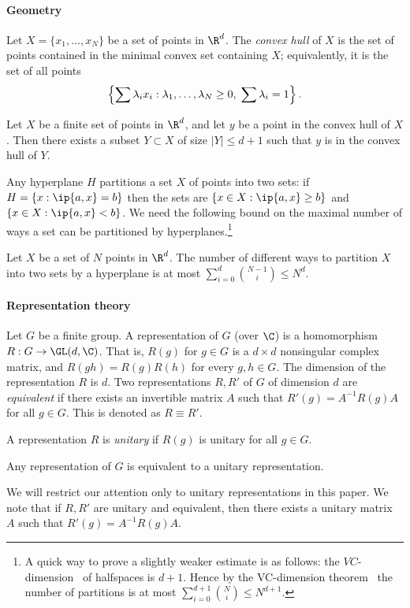 \paragraph{Geometry}
Let $X=\{x_1,\ldots,x_N\}$ be a set of points in $\R^d$. The \emph{convex hull} of $X$ is the set of points contained in the minimal convex
set containing $X$; equivalently, it is the set of all points 
\[
\Bigl\{\sum
\lambda_i x_i: \lambda_1,\ldots,\lambda_N \ge 0, \;\sum \lambda_i=1\Bigr\}\,.\]

\begin{fact}\label{fact:caratheodory}
Let $X$ be a finite set of points in $\R^d$, and let $y$ be a point
in the convex hull of $X$. Then there exists a subset $Y \subset X$
of size $|Y| \le d+1$ such that $y$ is in the convex hull of $Y$.
\end{fact}

Any hyperplane $H$ partitions a set $X$ of points into two sets: if
$H=\{x:\ip{a,x}=b\}$ then the sets are $\{x \in X:\ip{a,x} \ge b\}$
and $\{x \in X:\ip{a,x}<b\}$. We need the following bound on the maximal
number of ways
a set can be partitioned by hyperplanes.\footnote{A quick way to prove a slightly weaker estimate
is as follows: the $VC$-dimension~\cite{VC71} of
halfspaces is $d+1$. Hence by the VC-dimension
theorem~\cite{VC71,Sauer72,Shelah72} the number of partitions
is at most $\sum_{i=0}^{d+1} {N \choose i} \le N^{d+1}$.}
\begin{fact}
\label{fact:partition_hyperplane}
Let $X$ be a set of $N$ points in $\R^d$. The number
of different ways to partition $X$ into two sets by a hyperplane is
at most $\sum_{i=0}^d {{N-1} \choose i}  \leq N^{d}$.
\end{fact}

\paragraph{Representation theory}
Let $G$ be a finite group. A representation of $G$ (over $\C$) is a
homomorphism $R:G \to \GL(d,\C)$. That is, $R(g)$ for $g \in G$ is a
$d \times d$ nonsingular
complex matrix, and $R(gh) = R(g) R(h)$ for every $g,h \in
G$. The dimension of the representation $R$ is $d$. Two representations
$R,R'$ of $G$ of dimension $d$ are \emph{equivalent} if there exists an
invertible matrix $A$ such that $R'(g) = A^{-1} R(g) A$ for all $g \in
G$. This is denoted as $R \equiv R'$.

A representation $R$ is \emph{unitary}
if $R(g)$ is unitary for all $g \in G$.
\begin{fact}
Any representation of $G$ is equivalent to a unitary representation.
\end{fact}
We will restrict our attention only to unitary representations in this
paper. We note that if $R,R'$ are unitary and equivalent, then there
exists a unitary matrix $A$ such that $R'(g) = A^{-1} R(g) A$.

